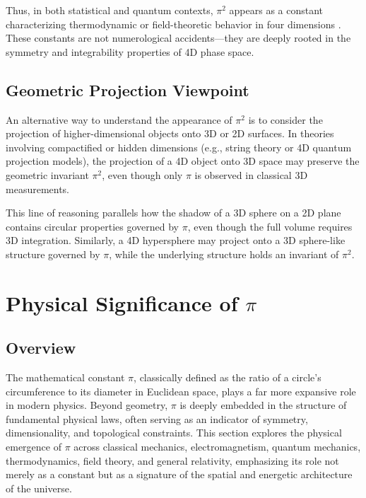 \documentclass[12pt,a4paper]{article}
\begin{document}
Thus, in both statistical and quantum contexts, \(\pi^2\) appears as a constant characterizing thermodynamic or field-theoretic behavior in four dimensions \cite{pi2-4d-physics}. These constants are not numerological accidents—they are deeply rooted in the symmetry and integrability properties of 4D phase space.

\subsection{Geometric Projection Viewpoint}

An alternative way to understand the appearance of \(\pi^2\) is to consider the projection of higher-dimensional objects onto 3D or 2D surfaces. In theories involving compactified or hidden dimensions (e.g., string theory or 4D quantum projection models), the projection of a 4D object onto 3D space may preserve the geometric invariant \(\pi^2\), even though only \(\pi\) is observed in classical 3D measurements.

This line of reasoning parallels how the shadow of a 3D sphere on a 2D plane contains circular properties governed by \(\pi\), even though the full volume requires 3D integration. Similarly, a 4D hypersphere may project onto a 3D sphere-like structure governed by \(\pi\), while the underlying structure holds an invariant of \(\pi^2\).




\section{Physical Significance of \(\pi\)}

\subsection{Overview}

The mathematical constant \(\pi\), classically defined as the ratio of a circle's circumference to its diameter in Euclidean space, plays a far more expansive role in modern physics. Beyond geometry, \(\pi\) is deeply embedded in the structure of fundamental physical laws, often serving as an indicator of symmetry, dimensionality, and topological constraints. This section explores the physical emergence of \(\pi\) across classical mechanics, electromagnetism, quantum mechanics, thermodynamics, field theory, and general relativity, emphasizing its role not merely as a constant but as a signature of the spatial and energetic architecture of the universe.
\end{document}
